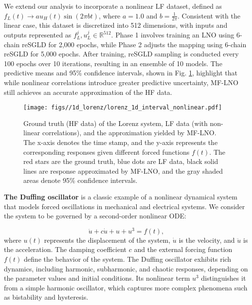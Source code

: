 We extend our analysis to incorporate a nonlinear LF dataset, defined as $f_L(t) \to a u_H(t) \sin(2\pi b t)$, where $a = 1.0$ and $b = \frac{1}{2\pi}$. Consistent with the linear case, this dataset is discretized into 512 dimensions, with inputs and outputs represented as $f_L^j, u_L^j \in \mathbb{R}^{512}$. Phase 1 involves training an LNO using 6-chain reSGLD for 2,000 epochs, while Phase 2 adjusts the mapping using 6-chain reSGLD for 5,000 epochs. After training, reSGLD sampling is conducted every 100 epochs over 10 iterations, resulting in an ensemble of 10 models. The predictive means and 95\% confidence intervals, shown in Fig. \ref{fig:lorenz_nonlinear}, highlight that while nonlinear correlations introduce greater predictive uncertainty, MF-LNO still achieves an accurate approximation of the HF data.  

\begin{figure}
    \centering
    \texttt{[image: figs//1d\_lorenz/lorenz\_1d\_interval\_nonlinear.pdf]}
    \caption{Ground truth (HF data) of the Lorenz system, LF data (with non-linear correlations), and the approximation yielded by MF-LNO. The x-axis denotes the time stamp, and the y-axis represents the corresponding responses given different forced functions $f(t)$. The red stars are the ground truth, blue dots are LF data, black solid lines are response approximated by MF-LNO, and the gray shaded areas denote 95\% confidence intervals.}
    \label{fig:lorenz_nonlinear}
\end{figure}

\textbf{The Duffing oscillator} is a classic example of a nonlinear dynamical system that models forced oscillations in mechanical and electrical systems. We consider the system to be governed by a second-order nonlinear ODE:

\begin{equation}\label{eq:duffing}
    \ddot{u} + c\dot{u} + u + u^3 = f(t),
\end{equation}
where $u(t)$ represents the displacement of the system, $\dot{u}$ is the velocity, and $\ddot{u}$ is the acceleration. The damping coefficient $c$ and the external forcing function $f(t)$ define the behavior of the system. The Duffing oscillator exhibits rich dynamics, including harmonic, subharmonic, and chaotic responses, depending on the parameter values and initial conditions. Its nonlinear term $u^3$ distinguishes it from a simple harmonic oscillator, which captures more complex phenomena such as bistability and hysteresis.


